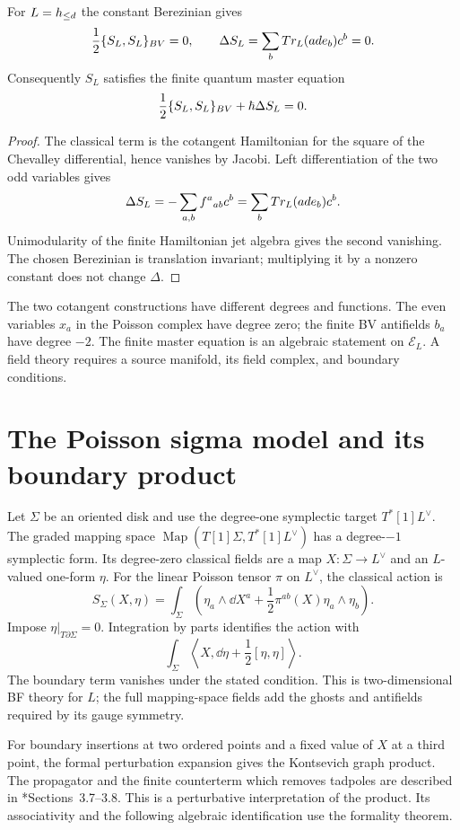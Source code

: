 \begin{theorem}
For $L=h_{\le d}$ the constant Berezinian gives
\[
 \frac12\{S_L,S_L\}_{BV}=0,
 \qquad
 \Delta S_L=\sum_bTr_L(ad e_b)c^b=0.
\]
Consequently $S_L$ satisfies the finite quantum master equation
\[
 \frac12\{S_L,S_L\}_{BV}+\hbar\Delta S_L=0.
\]
\end{theorem}
\begin{proof}
The classical term is the cotangent Hamiltonian for the square of the
Chevalley differential, hence vanishes by Jacobi.
Left differentiation of the two odd variables gives
\[
 \Delta S_L=-\sum_{a,b}f^a{}_{ab}c^b
            =\sum_bTr_L(ad e_b)c^b.
\]
Unimodularity of the finite Hamiltonian jet algebra gives the second
vanishing.  The chosen Berezinian is translation invariant; multiplying
it by a nonzero constant does not change $\Delta$.
\end{proof}

The two cotangent constructions have different degrees and functions.
The even variables $x_a$ in the Poisson complex have degree zero;
the finite BV antifields $b_a$ have degree $-2$.
The finite master equation is an algebraic statement on
$\mathcal E_L$.  A field theory requires a source manifold, its field
complex, and boundary conditions.

\section{The Poisson sigma model and its boundary product}
Let $\Sigma$ be an oriented disk and use the degree-one symplectic
target $T^*[1]L^\vee$.  The graded mapping space
$\operatorname{Map}(T[1]\Sigma,T^*[1]L^\vee)$ has a degree-$-1$
symplectic form.  Its degree-zero classical fields are a map
$X:\Sigma\to L^\vee$ and an $L$-valued one-form $\eta$.
For the linear Poisson tensor $\pi$ on $L^\vee$, the classical action is
\[
 S_\Sigma(X,\eta)
 =\int_\Sigma\left(\eta_a\wedge\dd X^a
        +\frac12\pi^{ab}(X)\eta_a\wedge\eta_b\right).
\]
Impose $\eta|_{T\partial\Sigma}=0$.
Integration by parts identifies the action with
\[
 \int_\Sigma\left\langle X,\dd\eta+
                              \frac12[\eta,\eta]\right\rangle.
\]
The boundary term vanishes under the stated condition.
This is two-dimensional BF theory for $L$; the full mapping-space fields add
the ghosts and antifields required by its gauge symmetry.

For boundary insertions at two ordered points and a fixed value of
$X$ at a third point, the formal perturbation expansion gives the
Kontsevich graph product.  The propagator and the finite counterterm
which removes tadpoles are described in
\cite{CattaneoFelderPSM}*{Sections~3.7--3.8}.
This is a perturbative interpretation of the product.  Its associativity
and the following algebraic identification use the formality theorem.

